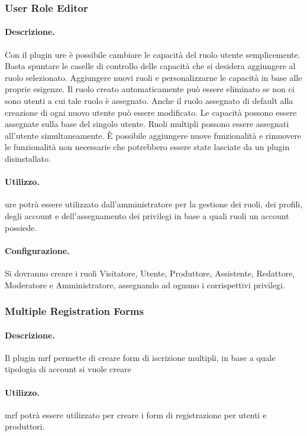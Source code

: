 \subsubsection{User Role Editor}
\paragraph{Descrizione.} Con il plugin \gls{ure} è possibile cambiare le capacità del ruolo utente semplicemente. Basta spuntare le caselle di controllo delle capacità che si desidera aggiungere al ruolo selezionato. Aggiungere nuovi ruoli e personalizzarne le capacità in base alle proprie esigenze. Il ruolo creato automaticamente può essere eliminato se non ci sono utenti a cui tale ruolo è assegnato. Anche il ruolo assegnato di default alla creazione di ogni nuovo utente può essere modificato. Le capacità possono essere assegnate sulla base del singolo utente. Ruoli multipli possono essere assegnati all'utente simultaneamente. È possibile aggiungere nuove funzionalità e rimuovere le funzionalità non necessarie che potrebbero essere state lasciate da un plugin disinstallato.
\paragraph{Utilizzo.} \gls{ure} potrà essere utilizzato dall'amministratore per la gestione dei ruoli, dei profili, degli account e dell'assegnamento dei privilegi in base a quali ruoli un account possiede.
\paragraph{Configurazione.} Si dovranno creare i ruoli Visitatore, Utente, Produttore, Assistente, Redattore, Moderatore e Amministratore, assegnando ad ognuno i corrispettivi privilegi.

\subsubsection{Multiple Registration Forms}
\paragraph{Descrizione.} Il plugin \gls{mrf} permette di creare form di iscrizione multipli, in base a quale tipologia di account si vuole creare
\paragraph{Utilizzo.}  \gls{mrf} potrà essere utilizzato per creare i form di registrazione per utenti e produttori.
